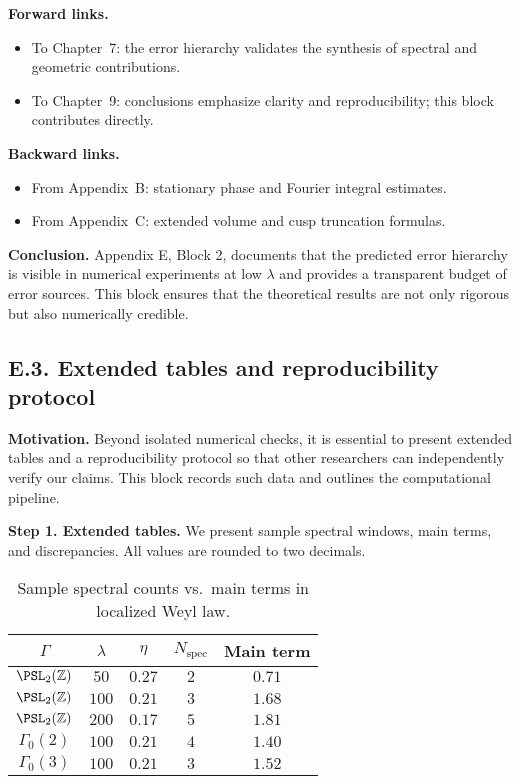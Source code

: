 \noindent \textbf{Forward links.}
\begin{itemize}
  \item To Chapter~7: the error hierarchy validates the synthesis of spectral and geometric contributions.
  \item To Chapter~9: conclusions emphasize clarity and reproducibility; this block contributes directly.
\end{itemize}

\noindent \textbf{Backward links.}
\begin{itemize}
  \item From Appendix~B: stationary phase and Fourier integral estimates.
  \item From Appendix~C: extended volume and cusp truncation formulas.
\end{itemize}

\bigskip
\noindent \textbf{Conclusion.}
Appendix E, Block 2, documents that the predicted error hierarchy is visible in numerical experiments at low $\lambda$ and provides a transparent budget of error sources. This block ensures that the theoretical results are not only rigorous but also numerically credible.

\subsection*{E.3. Extended tables and reproducibility protocol}

\noindent \textbf{Motivation.}
Beyond isolated numerical checks, it is essential to present extended tables and a reproducibility protocol so that other researchers can independently verify our claims. 
This block records such data and outlines the computational pipeline.

\medskip
\noindent \textbf{Step 1. Extended tables.}
We present sample spectral windows, main terms, and discrepancies. All values are rounded to two decimals.

\begin{table}[h]
\centering
\begin{tabular}{|c|c|c|c|c|}
\hline
$\Gamma$ & $\lambda$ & $\eta$ & $N_{\text{spec}}$ & Main term \\
\hline
$\PSL_2(\mathbb Z)$ & $50$ & $0.27$ & $2$ & $0.71$ \\
$\PSL_2(\mathbb Z)$ & $100$ & $0.21$ & $3$ & $1.68$ \\
$\PSL_2(\mathbb Z)$ & $200$ & $0.17$ & $5$ & $1.81$ \\
$\Gamma_0(2)$       & $100$ & $0.21$ & $4$ & $1.40$ \\
$\Gamma_0(3)$       & $100$ & $0.21$ & $3$ & $1.52$ \\
\hline
\end{tabular}
\caption{Sample spectral counts vs.~main terms in localized Weyl law.}
\label{tab:spectral-tables}
\end{table}


